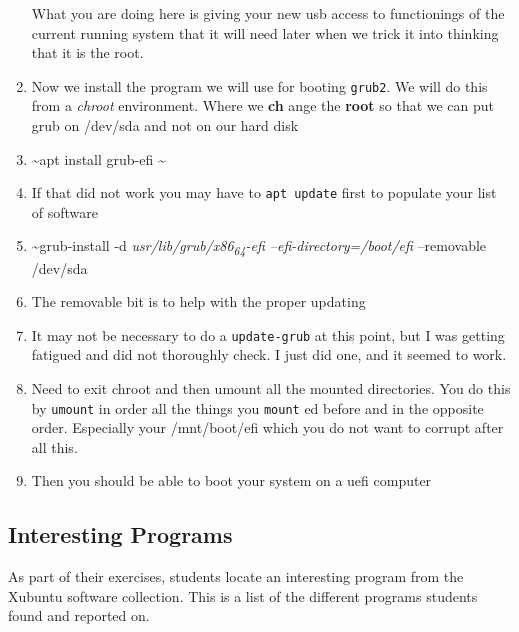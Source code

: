 \documentclass{article}
\begin{document}
\begin{enumerate}
What you are doing here is giving your new usb access to functionings of the current running system that it will need later when we trick it into thinking that it is the root.
\item Now we install the program we will use for booting \texttt{grub2}. We will do this from a \emph{chroot} environment. Where we \textbf{ch} ange the \textbf{root} so that we can put grub on /dev/sda and not on our hard disk
\item \textasciitilde{}apt install grub-efi \textasciitilde{}
\item If that did not work you may have to \texttt{apt update} first to populate your list of software
\item \textasciitilde{}grub-install -d \emph{usr/lib/grub/x86\textsubscript{64}-efi --efi-directory=/boot/efi} --removable /dev/sda
\item The removable bit is to help with the proper updating
\item It may not be necessary to do a \texttt{update-grub} at this point, but I was getting fatigued and did not thoroughly check. I just did one, and it seemed to work.
\item Need to exit chroot and then umount all the mounted directories. You do this by \texttt{umount} in order all the things you \texttt{mount} ed before and in the opposite order. Especially your /mnt/boot/efi which you do not want to corrupt after all this.
\item Then you should be able to boot your system on a uefi computer
\end{enumerate}
\subsection{Interesting Programs}
\label{sec:org9a92d12}
As part of their exercises, students locate an interesting program from the Xubuntu software collection. This is a list of the different programs students found and reported on.
\end{document}
